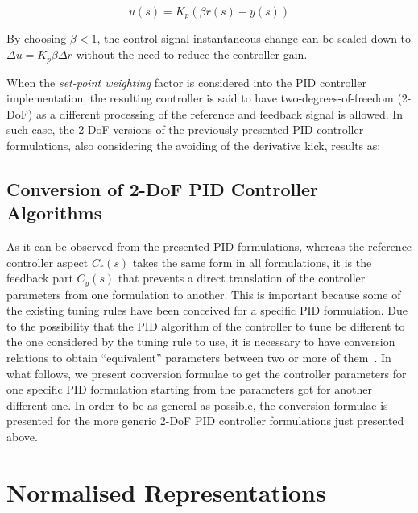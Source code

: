 \begin{equation}
u(s)=K_p(\beta r(s) - y(s))
\end{equation}

By choosing $\beta < 1$, the control signal instantaneous change can be scaled down to $\Delta u = K_p \beta \Delta r$  without the need to reduce the controller gain. 

When the \emph{set-point weighting} factor is considered into the PID controller implementation, the resulting controller is said to have two-degrees-of-freedom (2-DoF) as a different processing of the reference and feedback signal is allowed. In such case, the 2-DoF versions of the previously presented PID controller formulations, also considering the avoiding of the derivative kick, results as:

\subsection{Conversion of 2-DoF PID Controller Algorithms}
As it can be observed from the presented PID formulations, whereas the reference controller aspect $C_r(s)$ takes the same form in all formulations, it is the feedback part $C_y(s)$  that prevents a direct translation of the controller parameters from one formulation to another. This is important because some of the existing tuning rules have been conceived for a specific PID formulation. Due to the possibility that the PID algorithm of the controller to tune be different to the one considered by the tuning rule to use, it is necessary to have conversion relations to obtain ``equivalent'' parameters between two or more of them~\citep{alfaroetfa2012-2, vilanova2017WEE}. In what follows, we present conversion formulae to get the controller parameters for one specific PID formulation starting from the parameters got for another different one. In order to be as general as possible, the conversion formulae is presented for the more generic 2-DoF PID controller formulations just presented above.


\section{Normalised Representations}
\label{sec:4}

